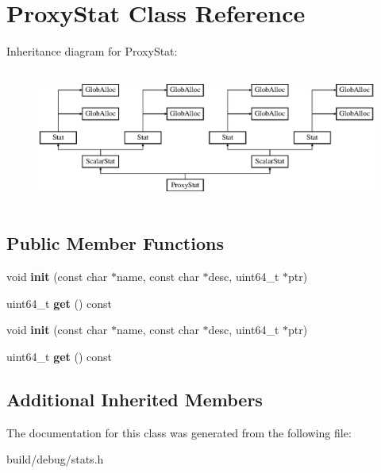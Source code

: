 \hypertarget{classProxyStat}{\section{Proxy\-Stat Class Reference}
\label{classProxyStat}
}
Inheritance diagram for Proxy\-Stat\-:\begin{figure}[H]
\begin{center}
\leavevmode
\includegraphics[height=4.487180cm]{classProxyStat}
\end{center}
\end{figure}
\subsection*{Public Member Functions}
\begin{DoxyCompactItemize}
\item 
\hypertarget{classProxyStat_a1b5bfbade0a65b5a41ad2b6495cc8f05}{void {\bfseries init} (const char $\ast$name, const char $\ast$desc, uint64\-\_\-t $\ast$ptr)}\label{classProxyStat_a1b5bfbade0a65b5a41ad2b6495cc8f05}

\item 
\hypertarget{classProxyStat_aa99ac0d9155f0488b9a7428c1df20ca7}{uint64\-\_\-t {\bfseries get} () const }\label{classProxyStat_aa99ac0d9155f0488b9a7428c1df20ca7}

\item 
\hypertarget{classProxyStat_a1b5bfbade0a65b5a41ad2b6495cc8f05}{void {\bfseries init} (const char $\ast$name, const char $\ast$desc, uint64\-\_\-t $\ast$ptr)}\label{classProxyStat_a1b5bfbade0a65b5a41ad2b6495cc8f05}

\item 
\hypertarget{classProxyStat_aa99ac0d9155f0488b9a7428c1df20ca7}{uint64\-\_\-t {\bfseries get} () const }\label{classProxyStat_aa99ac0d9155f0488b9a7428c1df20ca7}

\end{DoxyCompactItemize}
\subsection*{Additional Inherited Members}


The documentation for this class was generated from the following file\-:\begin{DoxyCompactItemize}
\item 
build/debug/stats.\-h\end{DoxyCompactItemize}
